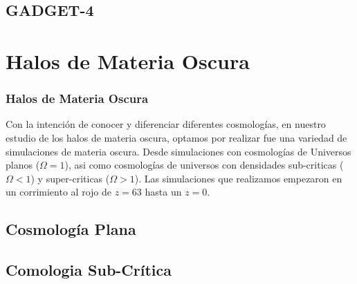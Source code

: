 \documentclass{beamer}
\begin{document}
\subsection{GADGET-4}
	\begin{frame}



	\end{frame}
	


\section{Halos de Materia Oscura}
\setcounter{equation}{0}
	\begin{frame}
		\frametitle{Halos de Materia Oscura}
		Con la intención de conocer y diferenciar diferentes cosmologías, en nuestro estudio de los halos de materia oscura, optamos por realizar fue una variedad de simulaciones de materia oscura. Desde simulaciones con cosmologías de Universos planos ($\Omega=1$), asi como cosmologías de universos con densidades sub-criticas ($\Omega < 1$) y super-criticas ($\Omega > 1$). Las simulaciones que realizamos empezaron en un corrimiento al rojo de $z = 63$ hasta un $z = 0$.
		
	\end{frame}
\subsection{Cosmología Plana}
	\begin{frame}



	\end{frame}

\subsection{Comologia Sub-Crítica}
	\begin{frame}



	\end{frame}
\end{document}
